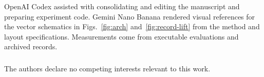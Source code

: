 \documentclass[runningheads]{llncs}
\begin{document}
\begin{credits}
\subsubsection{\ackname} OpenAI Codex assisted with consolidating and
editing the manuscript and preparing experiment code. Gemini Nano Banana
rendered visual references for the vector schematics in
Figs.~\ref{fig:arch} and~\ref{fig:record-lift} from the method and layout
specifications.
Measurements come from executable evaluations and archived records.
\subsubsection{\discintname} The authors declare no competing interests relevant to this work.
\end{credits}
\end{document}
